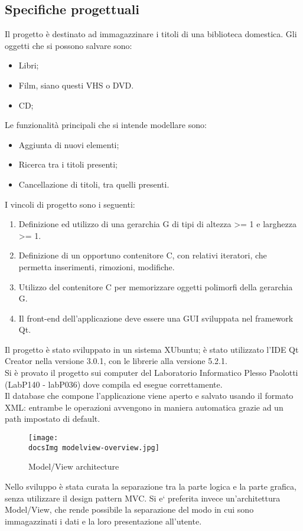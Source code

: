 {	\subsection{Specifiche progettuali}{
		Il progetto è destinato ad immagazzinare i titoli di una biblioteca domestica. Gli oggetti che si possono salvare sono:
		\begin{itemize}\itemsep0.5pt
			\item Libri;
			\item Film, siano questi  VHS o DVD.
			\item CD;
		\end{itemize}
		Le funzionalità principali che si intende modellare sono:
		\begin{itemize}\itemsep0.5pt
			\item Aggiunta di nuovi elementi;
			\item Ricerca tra i titoli presenti;
			\item Cancellazione di titoli, tra quelli presenti.
		\end{itemize}
		I vincoli di progetto sono i seguenti:
		\begin{enumerate}\itemsep0.5pt
			\item Definizione ed utilizzo di una gerarchia G di tipi di altezza >= 1 e larghezza >= 1.
			\item Definizione di un opportuno contenitore C, con relativi iteratori, che permetta inserimenti, rimozioni, modifiche.
			\item Utilizzo del contenitore C per memorizzare oggetti polimorfi della gerarchia G.
			\item Il front-end dell’applicazione deve essere una GUI sviluppata nel framework Qt.
		\end{enumerate}
		Il progetto è stato sviluppato in un sistema XUbuntu; è stato utilizzato l'IDE Qt Creator nella versione 3.0.1, con le librerie alla versione 5.2.1.	\\
		Si è provato il progetto sui computer del Laboratorio Informatico Plesso Paolotti (LabP140 - labP036) dove compila ed esegue correttamente.\\
		Il database che compone l'applicazione viene aperto e salvato usando il formato XML: entrambe le operazioni avvengono in maniera automatica grazie ad un path impostato di default. \\
	
	\begin{figure}
		\begin{center}
			\texttt{[image: \\docsImg modelview-overview.jpg]}
			\caption{Model/View architecture}
		\end{center}
	\end{figure}
		Nello sviluppo è stata curata la separazione tra la parte logica e la parte grafica, senza utilizzare il design pattern MVC. Si e` preferita invece un'architettura Model/View, che rende possibile la separazione del modo in cui sono immagazzinati i dati e la loro presentazione all'utente. %
	}
}